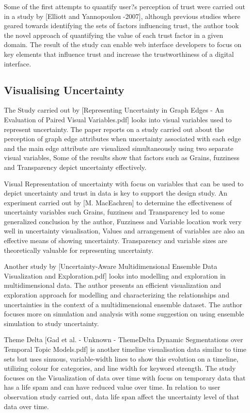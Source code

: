 \documentclass[journal]{vgtc}                %
\begin{document}
Some of the first attempts to quantify user?s perception of trust were carried out in a study by [Elliott and Yannopoulou -2007], although previous studies where geared towards identifying the sets of factors influencing trust, the author took the novel approach of quantifying the value of each trust factor in a given domain. The result of the study can enable web interface developers to focus on key elements that influence trust and increase the trustworthiness of a digital interface. 

\subsection{Visualising Uncertainty}
The Study carried out by [Representing Uncertainty in Graph Edges - An Evaluation of Paired Visual Variables.pdf] looks into visual variables used to represent uncertainty. 
The paper reports on a study carried out about the perception of graph edge attributes when uncertainty associated with each edge and the main edge attribute are visualized simultaneously using two separate visual variables, Some of the results show that factors such as Grains, fuzziness and Transparency depict uncertainty effectively.

Visual Representation of uncertainty with focus on variables that can be used to depict uncertainty and trust in data is key to support the design study. An experiment carried out by [M. MacEachren] to determine the effectiveness of uncertainty variables such Grains, fuzziness and Transparency led to some generalized conclusion by the author, Fuzziness and Variable location work very well in uncertainty visualisation, Values and arrangement of variables are also an effective means of showing uncertainty. Transparency and variable sizes are theoretically valuable for representing uncertainty.

Another study by [Uncertainty-Aware Multidimensional Ensemble Data Visualization and Exploration.pdf] looks into modelling and exploration in multidimensional data. The author presents an efficient visualization and exploration approach for modelling and characterizing the relationships and uncertainties in the context of a multidimensional ensemble dataset. The author focuses more on simulation and analysis with some suggestion on using ensemble simulation to study uncertainty.

Theme Delta [Gad et al. - Unknown - ThemeDelta Dynamic Segmentations over Temporal Topic Models.pdf] is another timeline visualisation data similar to time sets but uses sinuous, variable-width lines to show this evolution on a timeline, utilizing colour for categories, and line width for keyword strength.
The study focuses on the Visualization of data over time with focus on temporary data that has a life spam and can have reduced value over time. In relation to user observation study carried out, data life span affect the uncertainty level of that data over time.
\end{document}
